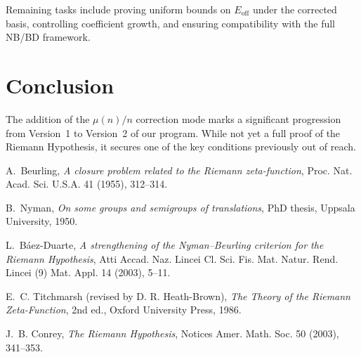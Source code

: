 \documentclass[12pt]{article}
\begin{document}
Remaining tasks include proving uniform bounds on 
$E_{\mathrm{off}}$ under the corrected basis,
controlling coefficient growth, and ensuring compatibility 
with the full NB/BD framework.

\section{Conclusion}
The addition of the $\mu(n)/n$ correction mode marks a significant
progression from Version~1 to Version~2 of our program.
While not yet a full proof of the Riemann Hypothesis, 
it secures one of the key conditions previously out of reach.

\begin{thebibliography}{9}

A.~Beurling,
\textit{A closure problem related to the Riemann zeta-function},
Proc. Nat. Acad. Sci. U.S.A. 41 (1955), 312--314.

B.~Nyman,
\textit{On some groups and semigroups of translations},
PhD thesis, Uppsala University, 1950.

L.~Báez-Duarte,
\textit{A strengthening of the Nyman--Beurling criterion for the Riemann Hypothesis},
Atti Accad. Naz. Lincei Cl. Sci. Fis. Mat. Natur. Rend. Lincei (9) Mat. Appl. 14 (2003), 5--11.

E.~C. Titchmarsh (revised by D. R. Heath-Brown),
\textit{The Theory of the Riemann Zeta-Function},
2nd ed., Oxford University Press, 1986.

J.~B. Conrey,
\textit{The Riemann Hypothesis},
Notices Amer. Math. Soc. 50 (2003), 341--353.

\end{thebibliography}
\end{document}
